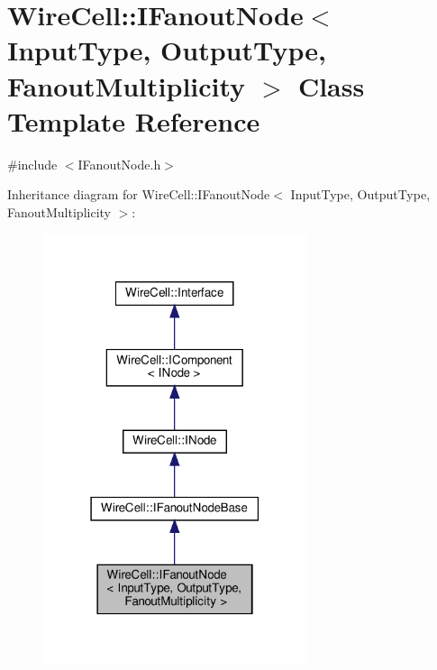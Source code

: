 \hypertarget{class_wire_cell_1_1_i_fanout_node}{}\section{Wire\+Cell\+:\+:I\+Fanout\+Node$<$ Input\+Type, Output\+Type, Fanout\+Multiplicity $>$ Class Template Reference}
\label{class_wire_cell_1_1_i_fanout_node}


{\ttfamily \#include $<$I\+Fanout\+Node.\+h$>$}



Inheritance diagram for Wire\+Cell\+:\+:I\+Fanout\+Node$<$ Input\+Type, Output\+Type, Fanout\+Multiplicity $>$\+:
\nopagebreak
\begin{figure}[H]
\begin{center}
\leavevmode
\includegraphics[width=219pt]{class_wire_cell_1_1_i_fanout_node__inherit__graph}
\end{center}
\end{figure}


